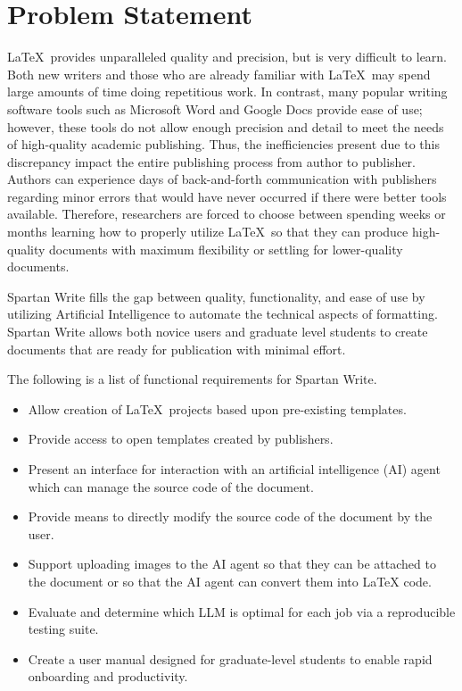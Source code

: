 \section{Problem Statement}

\LaTeX\ provides unparalleled quality and precision, but is very difficult to learn.
Both new writers and those who are already familiar with \LaTeX\ may spend large amounts of time doing repetitious work.
In contrast, many popular writing software tools such as Microsoft Word and Google Docs provide ease of use; however, these tools do not allow enough precision and detail to meet the needs of high-quality academic publishing.
Thus, the inefficiencies present due to this discrepancy impact the entire publishing process from author to publisher.
Authors can experience days of back-and-forth communication with publishers regarding minor errors that would have never occurred if there were better tools available.
Therefore, researchers are forced to choose between spending weeks or months learning how to properly utilize \LaTeX\ so that they can produce high-quality documents with maximum flexibility or settling for lower-quality documents.

Spartan Write fills the gap between quality, functionality, and ease of use by utilizing Artificial Intelligence to automate the technical aspects of formatting.
Spartan Write allows both novice users and graduate level students to create documents that are ready for publication with minimal effort.

The following is a list of functional requirements for Spartan Write.

\begin{itemize}
\item Allow creation of \LaTeX\ projects based upon pre-existing templates.
\item Provide access to open templates created by publishers.
\item Present an interface for interaction with an artificial intelligence (AI) agent which can manage the source code of the document.
\item Provide means to directly modify the source code of the document by the user.
\item Support uploading images to the AI agent so that they can be attached to the document or so that the AI agent can convert them into LaTeX code.
\item Evaluate and determine which LLM is optimal for each job via a reproducible testing suite.
\item Create a user manual designed for graduate-level students to enable rapid onboarding and productivity.
\end{itemize}
